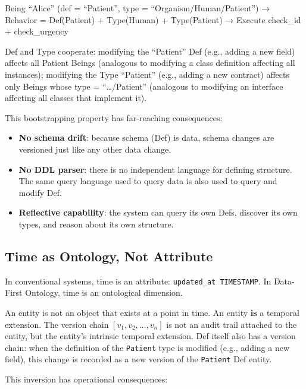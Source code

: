 \documentclass[11pt,a4paper]{article}
\begin{document}
Being ``Alice'' (def = ``Patient'', type = ``Organism/Human/Patient'') →
Behavior = Def(Patient) + Type(Human) + Type(Patient) → Execute
check\_id + check\_urgency

Def and Type cooperate: modifying the ``Patient'' Def (e.g., adding a
new field) affects all Patient Beings (analogous to modifying a class
definition affecting all instances); modifying the Type ``Patient''
(e.g., adding a new contract) affects only Beings whose type =
``\ldots/Patient'' (analogous to modifying an interface affecting all
classes that implement it).

This bootstrapping property has far-reaching consequences:

\begin{itemize}
\tightlist
\item
  \textbf{No schema drift}: because schema (Def) is data, schema changes
  are versioned just like any other data change.
\item
  \textbf{No DDL parser}: there is no independent language for defining
  structure. The same query language used to query data is also used to
  query and modify Def.
\item
  \textbf{Reflective capability}: the system can query its own Defs,
  discover its own types, and reason about its own structure.
\end{itemize}

\subsection{Time as Ontology, Not
Attribute}\label{time-as-ontology-not-attribute}

In conventional systems, time is an attribute:
\texttt{updated\_at\ TIMESTAMP}. In Data-First Ontology, time is an
ontological dimension.

An entity is not an object that exists at a point in time. An entity
\textbf{is} a temporal extension. The version chain
\([v_1, v_2, \ldots, v_n]\) is not an audit trail attached to the
entity, but the entity's intrinsic temporal extension. Def itself also
has a version chain: when the definition of the \texttt{Patient} type is
modified (e.g., adding a new field), this change is recorded as a new
version of the \texttt{Patient} Def entity.

This inversion has operational consequences:
\end{document}

